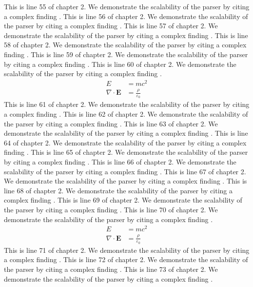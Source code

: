 This is line 55 of chapter 2. We demonstrate the scalability of the parser by citing a complex finding \cite{ref2_55}.
This is line 56 of chapter 2. We demonstrate the scalability of the parser by citing a complex finding \cite{ref2_56}.
This is line 57 of chapter 2. We demonstrate the scalability of the parser by citing a complex finding \cite{ref2_57}.
This is line 58 of chapter 2. We demonstrate the scalability of the parser by citing a complex finding \cite{ref2_58}.
This is line 59 of chapter 2. We demonstrate the scalability of the parser by citing a complex finding \cite{ref2_59}.
This is line 60 of chapter 2. We demonstrate the scalability of the parser by citing a complex finding \cite{ref2_60}.
\begin{align*}
  E &= mc^2 \\
  \nabla \cdot \mathbf{E} &= \frac{\rho}{\varepsilon_0}
\end{align*}
This is line 61 of chapter 2. We demonstrate the scalability of the parser by citing a complex finding \cite{ref2_61}.
This is line 62 of chapter 2. We demonstrate the scalability of the parser by citing a complex finding \cite{ref2_62}.
This is line 63 of chapter 2. We demonstrate the scalability of the parser by citing a complex finding \cite{ref2_63}.
This is line 64 of chapter 2. We demonstrate the scalability of the parser by citing a complex finding \cite{ref2_64}.
This is line 65 of chapter 2. We demonstrate the scalability of the parser by citing a complex finding \cite{ref2_65}.
This is line 66 of chapter 2. We demonstrate the scalability of the parser by citing a complex finding \cite{ref2_66}.
This is line 67 of chapter 2. We demonstrate the scalability of the parser by citing a complex finding \cite{ref2_67}.
This is line 68 of chapter 2. We demonstrate the scalability of the parser by citing a complex finding \cite{ref2_68}.
This is line 69 of chapter 2. We demonstrate the scalability of the parser by citing a complex finding \cite{ref2_69}.
This is line 70 of chapter 2. We demonstrate the scalability of the parser by citing a complex finding \cite{ref2_70}.
\begin{align*}
  E &= mc^2 \\
  \nabla \cdot \mathbf{E} &= \frac{\rho}{\varepsilon_0}
\end{align*}
This is line 71 of chapter 2. We demonstrate the scalability of the parser by citing a complex finding \cite{ref2_71}.
This is line 72 of chapter 2. We demonstrate the scalability of the parser by citing a complex finding \cite{ref2_72}.
This is line 73 of chapter 2. We demonstrate the scalability of the parser by citing a complex finding \cite{ref2_73}.
